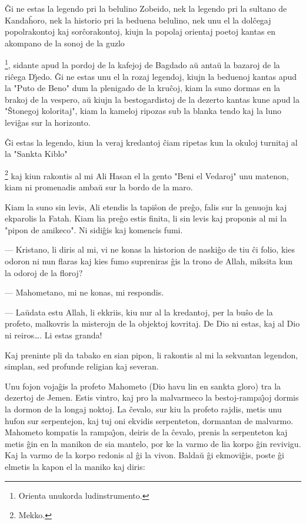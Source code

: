    \^Gi ne estas la legendo pri la belulino Zobeido, nek la legendo pri
la sultano de Kanda\^horo, nek la historio pri la beduena belulino,
nek unu el la dol\^cegaj popolrakontoj kaj sor\^corakontoj, kiujn la
popolaj orientaj poetoj kantas en akompano de la sonoj de la guzlo
{\footnote{Orienta unukorda ludinstrumento.}, sidante apud la pordoj
de la kafejoj de Bagdado a\u u anta\u u la bazaroj de la ri\^cega
D\^{\j}edo. \^Gi ne estas unu el la rozaj legendoj, kiujn la
beduenoj kantas apud la "Puto de Beno" dum la plenigado de la
kru\^coj, kiam la suno dormas en la brakoj de la vespero, a\u u
kiujn la bestogardistoj de la dezerto kantas kune apud la
"\^Stonegoj koloritaj", kiam la kameloj ripozas sub la blanka
tendo kaj la luno levi\^gas sur la horizonto.

   \^Gi estas la legendo, kiun la veraj kredantoj \^ciam ripetas kun
la okuloj turnitaj al la "Sankta Kiblo" {\footnote{Mekko.} kaj
kiun rakontis al mi Ali Hasan el la gento "Beni el Vedaroj" unu
matenon, kiam ni promenadis amba\u u sur la bordo de la maro.

   Kiam la suno sin levis, Ali etendis la tapi\^son de pre\^go, falis sur
la genuojn kaj ekparolis la Fatah. Kiam lia pre\^go estis finita, li
sin levis kaj proponis al mi la "pipon de amikeco". Ni sidi\^gis
kaj komencis fumi.

 --- Kristano, li diris al mi, vi ne konas la historion de naski\^go de
tiu \^ci folio, kies odoron ni nun flaras kaj kies fumo supreniras
\^gis la trono de Allah, miksita kun la odoroj de la floroj?

 --- Mahometano, mi ne konas, mi respondis.

 --- La\u udata estu Allah, li ekkriis, kiu nur al la kredantoj, per la
bu\^so de la profeto, malkovris la misterojn de la objektoj
kovritaj. De Dio ni estas, kaj al Dio ni reiros\dots . Li estas
granda!

   Kaj preninte pli da tabako en sian pipon, li rakontis al mi la
sekvantan legendon, simplan, sed profunde religian kaj severan.

   Unu fojon voja\^gis la profeto Mahometo (Dio havu lin en sankta
gloro) tra la dezertoj de Jemen. Estis vintro, kaj pro la malvarmeco
la bestoj-rampa\^{\j}oj dormis la dormon de la longaj noktoj. La
\^cevalo, sur kiu la profeto rajdis, metis unu hufon sur
serpentejon, kaj tuj oni ekvidis serpenteton, dormantan de malvarmo.
Mahometo kompatis la rampa\^{\j}on, deiris de la \^cevalo, prenis la
serpenteton kaj metis \^gin en la manikon de sia mantelo, por ke la
varmo de lia korpo \^gin revivigu. Kaj la varmo de la korpo redonis
al \^gi la vivon. Balda\u u \^gi ekmovi\^gis, poste \^gi elmetis la
kapon el la maniko kaj diris:

}}
